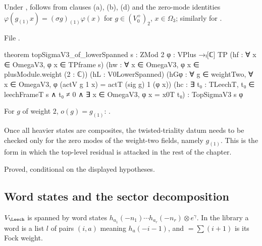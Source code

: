 \begin{theorem}\label{ch12:thm:of_lowerSpanned}
Under ,  follows from clauses (a), (b), (d) and the
zero-mode identities $\varphi(g_{(1)}x)=(\sigma g)_{(1)}\varphi(x)$ for $g\in(V_0^+)_2$, $x\in\Omega_3$; similarly
for .
\end{theorem}
File .
\begin{leancode}
theorem topSigmaV3_of_lowerSpanned {s : ZMod 2} {φ : VPlus →ₗ[ℂ] TP}
    (hf : ∀ x ∈ OmegaV3, φ x ∈ TPframe s) (hw : ∀ x ∈ OmegaV3, φ x ∈ plusModule.weight (2 : ℂ))
    (hL : V0LowerSpanned)
    (hGφ : ∀ g ∈ weightTwo, ∀ x ∈ OmegaV3, φ (actV g 1 x) = actT (sig g) 1 (φ x))
    (hc : ∃ t₀ : TLeechT, t₀ ∈ leechFrameT s ∧ t₀ ≠ 0 ∧ ∃ x ∈ OmegaV3, φ x = x0T t₀) :
    TopSigmaV3 s φ
\end{leancode}
\begin{dictionary}For $g$ of weight $2$, $o(g)=g_{(1)}$: .\end{dictionary}

\begin{physics}
Once all heavier states are composites, the twisted-triality datum needs to be checked only for the zero modes of the weight-two fields, namely $g_{(1)}$. This is the form in which the top-level residual is attacked in the rest of the chapter.
\end{physics}
\begin{status}Proved, conditional on the displayed hypotheses.\end{status}

\subsection{Word states and the sector decomposition}

$V_\Leech$ is spanned by word states $h_{a_1}(-n_1)\cdots h_{a_r}(-n_r)\otimes e^\gamma$.  In the library a
word is a list $l$ of pairs $(i,a)$ meaning $h_a(-i-1)$, and  $=\sum(i+1)$ is its Fock
weight.

